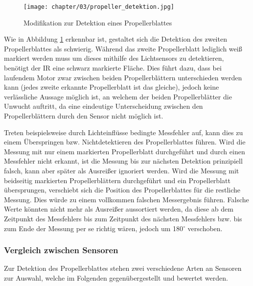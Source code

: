 \begin{figure}[h]
	\centering
	\texttt{[image: chapter/03/propeller\_detektion.jpg]}
	\caption{Modifikation zur Detektion eines Propellerblattes}
	\label{fig:propeller_detektion}
\end{figure}
Wie in Abbildung \ref{fig:propeller_detektion} erkennbar ist, gestaltet sich die Detektion des zweiten Propellerblattes als schwierig. 
Während das zweite Propellerblatt lediglich weiß markiert werden muss um dieses mithilfe des Lichtsensors zu detektieren, benötigt der \ac{IR} eine schwarz markierte Fläche.
Dies führt dazu, dass bei laufendem Motor zwar zwischen beiden Propellerblättern unterschieden werden kann (jedes zweite erkannte Propellerblatt ist das gleiche), jedoch keine verlässliche Aussage möglich ist, an welchem der beiden Propellerblätter die Unwucht auftritt, da eine eindeutige Unterscheidung zwischen den Propellerblättern durch den Sensor nicht möglich ist.

Treten beispielsweise durch Lichteinflüsse bedingte Messfehler auf, kann dies zu einem Überspringen bzw. Nichtdetektieren des Propellerblattes führen.
Wird die Messung mit nur einem markierten Propellerblatt durchgeführt und durch einen Messfehler nicht erkannt, ist die Messung bis zur nächsten Detektion prinzipiell falsch, kann aber später als Ausreißer ignoriert werden.
Wird die Messung mit beidseitig markierten Propellerblättern durchgeführt und ein Propellerblatt übersprungen, verschiebt sich die Position des Propellerblattes für die restliche Messung.
Dies würde zu einem vollkommen falschen Messergebnis führen.
Falsche Werte könnten nicht mehr als Ausreißer aussortiert werden, da diese ab dem Zeitpunkt des Messfehlers bis zum Zeitpunkt des nächsten Messfehlers bzw. bis zum Ende der Messung per se richtig wären, jedoch um 180$^\circ$ verschoben.

\subsubsection*{Vergleich zwischen Sensoren}
Zur Detektion des Propellerblattes stehen zwei verschiedene Arten an Sensoren zur Auswahl, welche im Folgenden gegenübergestellt und bewertet werden.

